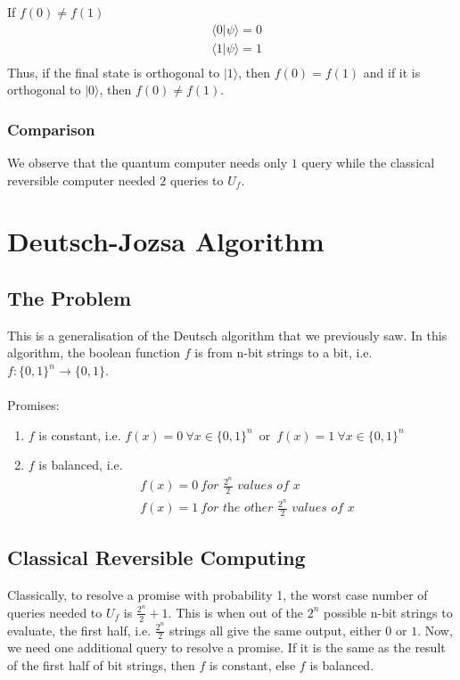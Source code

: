 \documentclass{article}
\begin{document}
    If $f(0)\neq f(1)$
    \begin{align*}
        & \langle 0 | \psi \rangle = 0\\
        & \langle 1| \psi \rangle = 1\\
    \end{align*}
    Thus, if the final state is orthogonal to $|1\rangle$, then $f(0)=f(1)$ and if it is orthogonal to $|0\rangle$, then $f(0) \neq f(1)$. \\

    \subsubsection{Comparison}
    We observe that the quantum computer needs only $1$ query while the classical reversible computer needed $2$ queries to $U_f$. 

    \section{Deutsch-Jozsa Algorithm}
    \subsection{The Problem}
    This is a generalisation of the Deutsch algorithm that we previously saw. In this algorithm, the boolean function $f$ is from n-bit strings to a bit, i.e.\\
    \mbox{$f: \{0,1 \}^n \rightarrow \{0,1\}$}.\\
    \\
    Promises:
    \begin{enumerate}[label=(\roman*)]
        \item $f$ is constant, i.e. \mbox{$f(x)=0 \ \forall x \in \{0,1\}^n$ or $f(x)=1 \ \forall x \in \{0,1\}^n$}
        \item $f$ is balanced, i.e. 
        \begin{align*}
            &f(x)=0 \ \textit{for } \frac{2^n}{2} \textit{ values of $x$}\\
            &f(x)=1 \ \textit{for the other } \frac{2^n}{2} \textit{ values of $x$}
        \end{align*}
    \end{enumerate}

    \subsection{Classical Reversible Computing}
    Classically, to resolve a promise with probability 1, the worst case number of queries needed to $U_f$ is $\frac{2^n}{2} + 1$. This is when out of the $2^n$ possible n-bit strings to evaluate, the first half, i.e. $\frac{2^n}{2}$ strings all give the same output, either $0$ or $1$. Now, we need one additional query to resolve a promise. If it is the same as the result of the first half of bit strings, then $f$ is constant, else $f$ is balanced.
\end{document}
